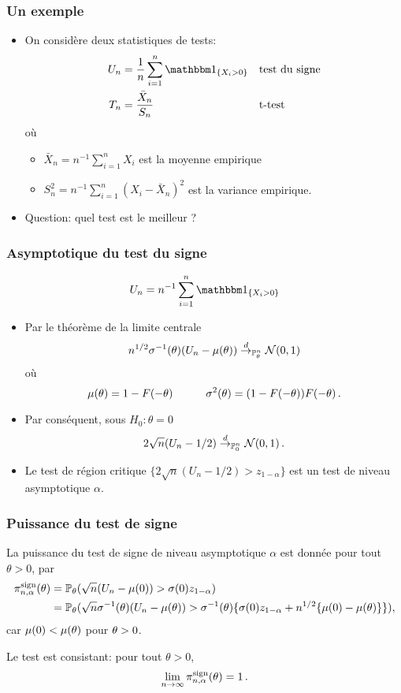 \begin{frame}
\frametitle{Un exemple}
\begin{itemize}
\item On considère deux statistiques de tests:
\begin{align*}
U_n&= \frac{1}{n} \sum_{i=1}^n \indi{X_i > 0} &&\text{test du signe} \\
T_n&= \frac{\bar{X}_n}{S_n}     &&\text{t-test}
\end{align*}
où \begin{itemize}
\item $\bar{X}_n= n^{-1} \sum_{i=1}^n X_i$ est la \alert{moyenne empirique}
\item $S_n^2= n^{-1} \sum_{i=1}^n (X_i - \bar{X}_n)^2$ est la \alert{variance empirique}.
\end{itemize}
\item \alert{Question:} quel test est le meilleur ?
\end{itemize}
\end{frame}

\begin{frame}
\frametitle{Asymptotique du test du signe}
$$
U_n= n^{-1} \sum_{i=1}^n \indi{X_i > 0}
$$
\begin{itemize}
\item Par le théorème de la limite centrale
$$
n^{1/2} \sigma^{-1}(\theta) (U_n - \mu(\theta)) \stackrel{d}{\rightarrow}_{\operatorname{{\mathbb P}}^n_\theta} \mathcal{N}(0,1)
$$
où
\[
\mu(\theta) = 1 - F(-\theta) \quad \qquad \sigma^2(\theta) = (1-F(-\theta)) F(-\theta) \,.
\]
\item Par conséquent, sous $H_0: \theta = 0$
\[
2 \sqrt{n} (U_n - 1/2) \stackrel{d}{\rightarrow}_{\operatorname{{\mathbb P}}^n_0} \mathcal{N}(0,1) \,.
\]
\item Le test de région critique  $\{ 2 \sqrt{n} (U_n -1/2) > z_{ 1-\alpha} \}$ est un test de niveau asymptotique $\alpha$.
\end{itemize}
\end{frame}

\begin{frame}
\frametitle{Puissance du test de signe}
La puissance du test de signe de niveau asymptotique $\alpha$ est donnée pour tout $\theta > 0$, par
\begin{align*}
\pi^{\mathrm{sign}}_{n,\alpha}(\theta)
&= \operatorname{{\mathbb P}}_\theta( \sqrt{n}(U_n - \mu(0)) > \sigma(0) z_{1-\alpha}) \\
&= \operatorname{{\mathbb P}}_\theta( \sqrt{n} \sigma^{-1}(\theta) (U_n - \mu(\theta)) > \sigma^{-1}(\theta) \{ \sigma(0) z_{1-\alpha} + n^{1/2} \{\mu(0)-\mu(\theta)\}\}), \end{align*}
car $\mu(0) < \mu(\theta)$ pour $\theta > 0$.


Le test est \alert{consistant}: pour tout $\theta > 0$,
\alert{
\[
\lim_{n \to \infty}  \pi^{\mathrm{sign}}_{n,\alpha}(\theta) = 1 \,.
\]
}
\end{frame}



